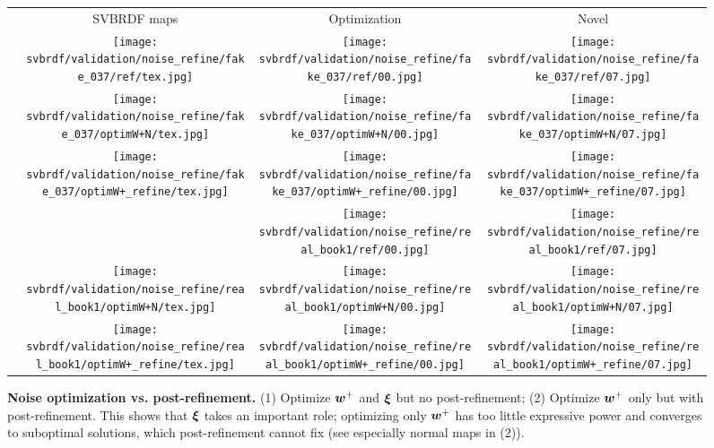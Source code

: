 \begin{figure}[h!]
	\centering
	\setlength{\resLen}{1.in}
	\setlength{\raiseLen}{0.4in}
	\addtolength{\tabcolsep}{-4pt}
	\begin{tabular}{cccc}
		& SVBRDF maps & Optimization & Novel
		\\
		\raisebox{\raiseLen}{\rotatebox[origin=c]{90}{GT}} &
		\texttt{[image: svbrdf/validation/noise\_refine/fake\_037/ref/tex.jpg]} &
		\texttt{[image: svbrdf/validation/noise\_refine/fake\_037/ref/00.jpg]} &
		\texttt{[image: svbrdf/validation/noise\_refine/fake\_037/ref/07.jpg]}
		\\
		\raisebox{\raiseLen}{\rotatebox[origin=c]{0}{(1)}} &
		\texttt{[image: svbrdf/validation/noise\_refine/fake\_037/optimW+N/tex.jpg]} &
		\texttt{[image: svbrdf/validation/noise\_refine/fake\_037/optimW+N/00.jpg]} &
		\texttt{[image: svbrdf/validation/noise\_refine/fake\_037/optimW+N/07.jpg]}
		\\
		\raisebox{\raiseLen}{\rotatebox[origin=c]{0}{(2)}} &
		\texttt{[image: svbrdf/validation/noise\_refine/fake\_037/optimW+\_refine/tex.jpg]} &
		\texttt{[image: svbrdf/validation/noise\_refine/fake\_037/optimW+\_refine/00.jpg]} &
		\texttt{[image: svbrdf/validation/noise\_refine/fake\_037/optimW+\_refine/07.jpg]}
		\\
		\raisebox{\raiseLen}{\rotatebox[origin=c]{90}{GT}} &
		 &
		\texttt{[image: svbrdf/validation/noise\_refine/real\_book1/ref/00.jpg]} &
		\texttt{[image: svbrdf/validation/noise\_refine/real\_book1/ref/07.jpg]}
		\\
		\raisebox{\raiseLen}{\rotatebox[origin=c]{0}{(1)}} &
		\texttt{[image: svbrdf/validation/noise\_refine/real\_book1/optimW+N/tex.jpg]} &
		\texttt{[image: svbrdf/validation/noise\_refine/real\_book1/optimW+N/00.jpg]} &
		\texttt{[image: svbrdf/validation/noise\_refine/real\_book1/optimW+N/07.jpg]}
		\\
		\raisebox{\raiseLen}{\rotatebox[origin=c]{0}{(2)}} &
		\texttt{[image: svbrdf/validation/noise\_refine/real\_book1/optimW+\_refine/tex.jpg]} &
		\texttt{[image: svbrdf/validation/noise\_refine/real\_book1/optimW+\_refine/00.jpg]} &
		\texttt{[image: svbrdf/validation/noise\_refine/real\_book1/optimW+\_refine/07.jpg]}
	\end{tabular}
	\caption[Noise optimization vs. post-refinement]{\label{fig:svbrdf:noise_vs_refine}
		\textbf{Noise optimization vs. post-refinement.} (1) Optimize $\bm{w}^+$ and $\bm{\xi}$ but no post-refinement; (2) Optimize $\bm{w}^+$ only but with post-refinement. This shows that $\bm{\xi}$ takes an important role; optimizing only $\bm{w}^+$ has too little expressive power and converges to suboptimal solutions, which post-refinement cannot fix (see especially normal maps in (2)).
	}
\end{figure}